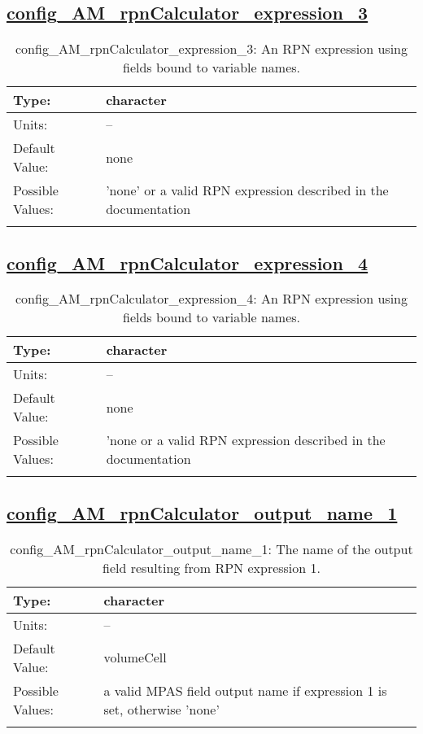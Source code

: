 \subsection[config\_AM\_rpnCalculator\_expression\_3]{\hyperref[sec:nm_tab_AM_rpnCalculator]{config\_AM\_rpnCalculator\_expression\_3}}
\label{subsec:nm_sec_config_AM_rpnCalculator_expression_3}
\begin{center}
\begin{longtable}{| p{2.0in} || p{4.0in} |}
    \hline
    Type: & character \\
    \hline
    Units: & -- \\
    \hline
    Default Value: & none \\
    \hline
    Possible Values: & 'none' or a valid RPN expression described in the documentation \\
    \hline
    \caption{config\_AM\_rpnCalculator\_expression\_3: An RPN expression using fields bound to variable names.}
\end{longtable}
\end{center}
\subsection[config\_AM\_rpnCalculator\_expression\_4]{\hyperref[sec:nm_tab_AM_rpnCalculator]{config\_AM\_rpnCalculator\_expression\_4}}
\label{subsec:nm_sec_config_AM_rpnCalculator_expression_4}
\begin{center}
\begin{longtable}{| p{2.0in} || p{4.0in} |}
    \hline
    Type: & character \\
    \hline
    Units: & -- \\
    \hline
    Default Value: & none \\
    \hline
    Possible Values: & 'none or a valid RPN expression described in the documentation \\
    \hline
    \caption{config\_AM\_rpnCalculator\_expression\_4: An RPN expression using fields bound to variable names.}
\end{longtable}
\end{center}
\subsection[config\_AM\_rpnCalculator\_output\_name\_1]{\hyperref[sec:nm_tab_AM_rpnCalculator]{config\_AM\_rpnCalculator\_output\_name\_1}}
\label{subsec:nm_sec_config_AM_rpnCalculator_output_name_1}
\begin{center}
\begin{longtable}{| p{2.0in} || p{4.0in} |}
    \hline
    Type: & character \\
    \hline
    Units: & -- \\
    \hline
    Default Value: & volumeCell \\
    \hline
    Possible Values: & a valid MPAS field output name if expression 1 is set, otherwise 'none' \\
    \hline
    \caption{config\_AM\_rpnCalculator\_output\_name\_1: The name of the output field resulting from RPN expression 1.}
\end{longtable}
\end{center}
